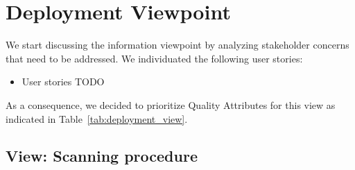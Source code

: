 \section{Deployment Viewpoint}
We start discussing the information viewpoint by analyzing stakeholder concerns that need to be addressed.
We individuated the following user stories:
\begin{itemize}
    \item User stories TODO
\end{itemize}

As a consequence, we decided to prioritize Quality Attributes for this view as indicated in Table~\ref{tab:deployment_view}.
\begin{table}[h!]
    \centering
    \caption{Deployment View Prioritized Quality Attributes}
    \label{tab:deployment_view}
\end{table}

\subsection{View: Scanning procedure}
